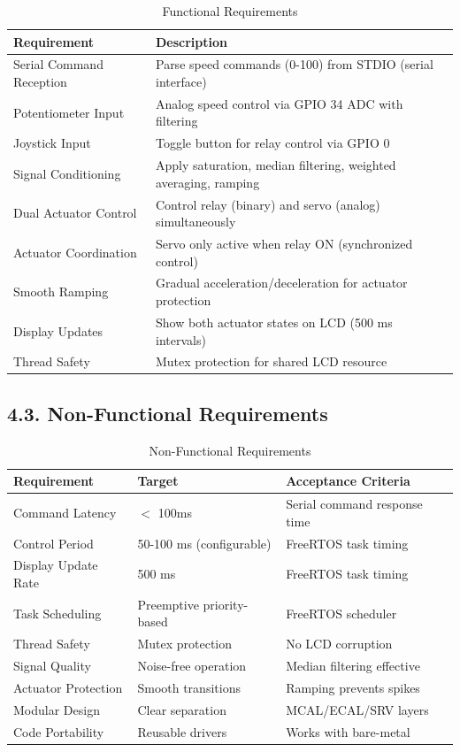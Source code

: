 \documentclass[12pt]{article}
\begin{document}
\begin{table}[H]
	\centering
	\caption{Functional Requirements}
	\label{tab:functional-requirements}
	\begin{tabular}{|l|l|}
		\hline
		\textbf{Requirement} & \textbf{Description} \\
		\hline
		Serial Command Reception & Parse speed commands (0-100) from STDIO (serial interface) \\
		\hline
		Potentiometer Input & Analog speed control via GPIO 34 ADC with filtering \\
		\hline
		Joystick Input & Toggle button for relay control via GPIO 0 \\
		\hline
		Signal Conditioning & Apply saturation, median filtering, weighted averaging, ramping \\
		\hline
		Dual Actuator Control & Control relay (binary) and servo (analog) simultaneously \\
		\hline
		Actuator Coordination & Servo only active when relay ON (synchronized control) \\
		\hline
		Smooth Ramping & Gradual acceleration/deceleration for actuator protection \\
		\hline
		Display Updates & Show both actuator states on LCD (500 ms intervals) \\
		\hline
		Thread Safety & Mutex protection for shared LCD resource \\
		\hline
	\end{tabular}
\end{table}

\subsection*{4.3. Non-Functional Requirements}

\begin{table}[H]
	\centering
	\caption{Non-Functional Requirements}
	\label{tab:non-functional-requirements}
	\begin{tabular}{|l|l|l|}
		\hline
		\textbf{Requirement} & \textbf{Target} & \textbf{Acceptance Criteria} \\
		\hline
		Command Latency & $<$ 100ms & Serial command response time \\
		\hline
		Control Period & 50-100 ms (configurable) & FreeRTOS task timing \\
		\hline
		Display Update Rate & 500 ms & FreeRTOS task timing \\
		\hline
		Task Scheduling & Preemptive priority-based & FreeRTOS scheduler \\
		\hline
		Thread Safety & Mutex protection & No LCD corruption \\
		\hline
		Signal Quality & Noise-free operation & Median filtering effective \\
		\hline
		Actuator Protection & Smooth transitions & Ramping prevents spikes \\
		\hline
		Modular Design & Clear separation & MCAL/ECAL/SRV layers \\
		\hline
		Code Portability & Reusable drivers & Works with bare-metal \\
		\hline
	\end{tabular}
\end{table}
\end{document}
